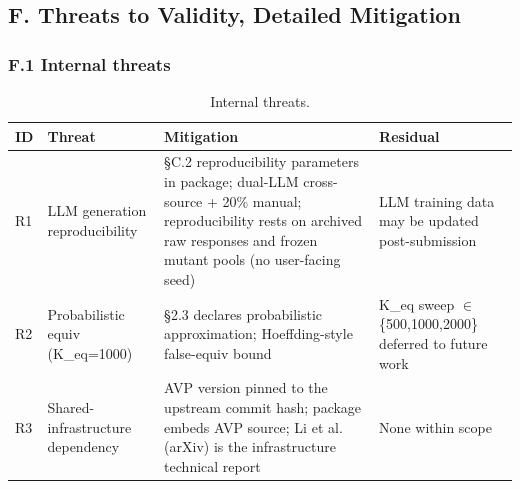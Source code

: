 \documentclass[review,12pt,authoryear]{elsarticle}
\begin{document}

\subsection{F. Threats to Validity, Detailed Mitigation}\label{f.-threats-to-validity-detailed-mitigation}

\subsubsection{F.1 Internal threats}\label{f.1-internal-threats}

{\def\LTcaptype{table} %
\begin{longtable}[]{@{}
  >{\raggedright\arraybackslash}p{}
  >{\raggedright\arraybackslash}p{}
  >{\raggedright\arraybackslash}p{}
  >{\raggedright\arraybackslash}p{}@{}}
\caption{Internal threats.}\label{tab:p2-27}\\
\toprule\noalign{}
\begin{minipage}[b]{\linewidth}\raggedright
ID
\end{minipage} & \begin{minipage}[b]{\linewidth}\raggedright
Threat
\end{minipage} & \begin{minipage}[b]{\linewidth}\raggedright
Mitigation
\end{minipage} & \begin{minipage}[b]{\linewidth}\raggedright
Residual
\end{minipage} \\
\midrule\noalign{}
\endfirsthead
\endhead
\bottomrule\noalign{}
\endlastfoot
R1 & LLM generation reproducibility & §C.2 reproducibility parameters in
package; dual-LLM cross-source + 20\% manual; reproducibility rests on
archived raw responses and frozen mutant pools (no user-facing seed) & LLM training data may be updated
post-submission \\
R2 & Probabilistic equiv (K\_eq=1000) & §2.3 declares probabilistic
approximation; Hoeffding-style false-equiv bound & K\_eq sweep $\in$
\{500,1000,2000\} deferred to future work \\
R3 & Shared-infrastructure dependency & AVP version pinned to the upstream commit hash;
package embeds AVP source; Li et al. (arXiv) is the infrastructure technical report &
None within scope \\

\end{longtable}}
\end{document}
